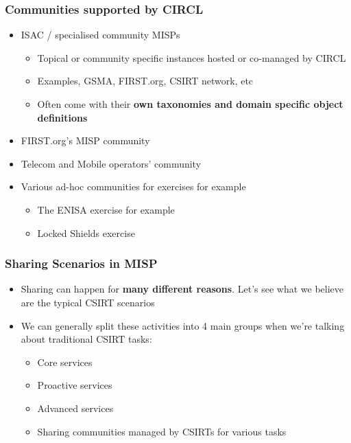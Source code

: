 \begin{frame}
\frametitle{Communities supported by CIRCL}
\begin{itemize}
        \item ISAC / specialised community MISPs
        \begin{itemize}
            \item Topical or community specific instances hosted or co-managed by CIRCL
            \item Examples, GSMA, FIRST.org, CSIRT network, etc
            \item Often come with their {\bf own taxonomies and domain specific object definitions}
        \end{itemize}
	\item FIRST.org's MISP community
	\item Telecom and Mobile operators' community
	\item Various ad-hoc communities for exercises for example
	\begin{itemize}
		\item The ENISA exercise for example
                \item Locked Shields exercise
	\end{itemize}
\end{itemize}
\end{frame}

\begin{frame}
\frametitle{Sharing Scenarios in MISP}
\begin{itemize}
	\item Sharing can happen for {\bf many different reasons}. Let's see what we believe are the typical CSIRT scenarios
        \item We can generally split these activities into 4 main groups when we're talking about traditional CSIRT tasks:
	\begin{itemize}
		\item Core services
		\item Proactive services
		\item Advanced services
		\item Sharing communities managed by CSIRTs for various tasks
	\end{itemize}
\end{itemize}
\end{frame}

